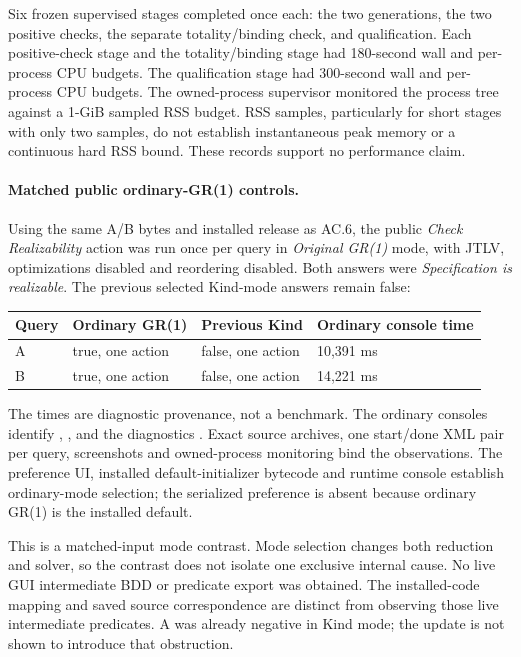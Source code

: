 Six frozen supervised stages completed once each: the two generations,
the two positive checks, the separate totality/binding check, and
qualification. Each positive-check stage and the totality/binding stage
had 180-second wall and per-process CPU budgets. The qualification stage had
300-second wall and per-process CPU budgets. The owned-process
supervisor monitored the process tree against a 1-GiB sampled RSS budget.
RSS samples, particularly for short stages with only two samples, do
not establish instantaneous peak memory or a continuous hard RSS bound.
These records support no performance claim.

\paragraph{Matched public ordinary-GR(1) controls.}
Using the same A/B bytes and installed release as AC.6, the public
\emph{Check Realizability} action was run once per query in
\emph{Original GR(1)} mode, with JTLV, optimizations disabled and
reordering disabled. Both answers were \emph{Specification is realizable}.
The previous selected Kind-mode answers remain false:
\begin{center}\small
\begin{tabular}{@{}llll@{}}\toprule
Query & Ordinary GR(1) & Previous Kind & Ordinary console time\\\midrule
A & true, one action & false, one action & 10,391 ms\\
B & true, one action & false, one action & 14,221 ms\\\bottomrule
\end{tabular}
\end{center}
The times are diagnostic provenance, not a benchmark.
The ordinary consoles identify ,
, and the diagnostics
. Exact source archives, one start/done XML
pair per query, screenshots and owned-process monitoring bind the
observations. The preference UI, installed default-initializer bytecode
and runtime console establish ordinary-mode selection; the serialized
 preference is absent because ordinary GR(1) is
the installed default.

This is a matched-input mode contrast. Mode selection changes both
reduction and solver, so the contrast does not isolate one exclusive
internal cause. No live GUI intermediate BDD or predicate export was
obtained. The installed-code mapping and saved source correspondence
are distinct from observing those live intermediate predicates.
A was already negative in Kind mode; the update is not shown to
introduce that obstruction.


